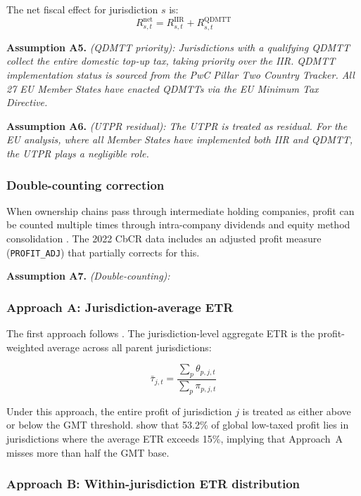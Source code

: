\documentclass[11pt,a4paper]{article}
\newcommand{\code}[1]{\texttt{#1}}
\newcommand{\assumption}[2]{\noindent\textbf{Assumption #1.} \textit{#2}\medskip}
\begin{document}
The net fiscal effect for jurisdiction $s$ is:
\begin{equation}\label{eq:net}
R_{s,t}^{\text{net}} = R_{s,t}^{\text{IIR}} + R_{s,t}^{\text{QDMTT}}
\end{equation}

\assumption{A5}{(QDMTT priority): Jurisdictions with a qualifying QDMTT collect the entire domestic top-up tax, taking priority over the IIR. QDMTT implementation status is sourced from the PwC Pillar Two Country Tracker. All 27 EU Member States have enacted QDMTTs via the EU Minimum Tax Directive.}

\assumption{A6}{(UTPR residual): The UTPR is treated as residual. For the EU analysis, where all Member States have implemented both IIR and QDMTT, the UTPR plays a negligible role.}

\subsubsection{Double-counting correction}\label{sec:doublecounting}

When ownership chains pass through intermediate holding companies, profit can be counted multiple times through intra-company dividends and equity method consolidation \citep{blouin2023}. The 2022 CbCR data includes an adjusted profit measure (\code{PROFIT\_ADJ}) that partially corrects for this.

\assumption{A7}{(Double-counting): }

\subsubsection{Approach A: Jurisdiction-average ETR}\label{sec:approach_a}

The first approach follows \citet{barake2022}. The jurisdiction-level aggregate ETR is the profit-weighted average across all parent jurisdictions:

\begin{equation}\label{eq:etr_agg}
\bar{\tau}_{j,t} = \frac{\sum_p \theta_{p,j,t}}{\sum_p \pi_{p,j,t}}
\end{equation}

Under this approach, the entire profit of jurisdiction $j$ is treated as either above or below the GMT threshold. \citet{hugger2026} show that 53.2\% of global low-taxed profit lies in jurisdictions where the average ETR exceeds 15\%, implying that Approach~A misses more than half the GMT base.

\subsubsection{Approach B: Within-jurisdiction ETR distribution}\label{sec:approach_b}
\end{document}
